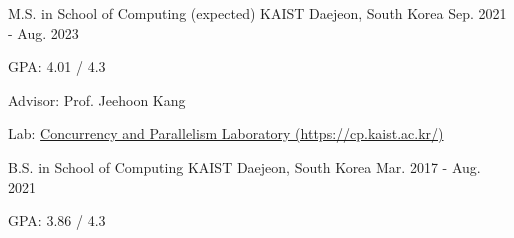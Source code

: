 

\begin{cventries}

  \cventry
    {M.S. in School of Computing (expected)} %
    {KAIST} %
    {Daejeon, South Korea} %
    {Sep. 2021 - Aug. 2023} %
    {
      \begin{cvitems} %
        \item {GPA: 4.01 / 4.3}
        \item {Advisor: Prof. Jeehoon Kang}
        \item {Lab: \href{https://cp.kaist.ac.kr/}{Concurrency and Parallelism Laboratory (https://cp.kaist.ac.kr/)} }
      \end{cvitems}
    }

  \cventry
    {B.S. in School of Computing} %
    {KAIST} %
    {Daejeon, South Korea} %
    {Mar. 2017 - Aug. 2021} %
    {
      \begin{cvitems} %
        \item {GPA: 3.86 / 4.3}
      \end{cvitems}
    }
\end{cventries}
